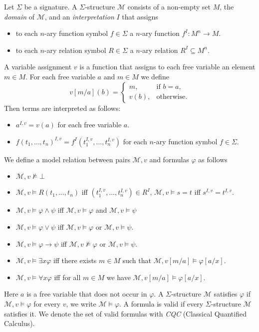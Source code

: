 \documentclass[runningheads]{llncs}
\begin{document}
\begin{definition}
	Let $\Sigma$ be a signature. A $\Sigma$-structure $\mathcal{M}$ consists of a non-empty set $M$, the \emph{domain} of $\mathcal{M}$, and an \emph{interpretation} $I$ that assigns
	\begin{itemize}
		\item to each $n$-ary function symbol $f\in\Sigma$ a $n$-ary function $f^I: M^n\to M$.
		\item to each $n$-ary relation symbol $R\in\Sigma$ a $n$-ary relation $R^I\subseteq M^n$.
	\end{itemize}
	A variable assignment $v$ is a function that assigns to each free variable an element $m\in M$. For each free variable $a$ and $m\in M$ we define $$v[m/a](b) = \begin{cases}
	m, &\text{if $b=a$,}\\
	v(b), &\text{otherwise.}
	\end{cases}$$
	Then terms are interpreted as follows:
	\begin{itemize}
		\item $a^{I, v} = v(a)$ for each free variable $a$.
		\item $f(t_1,\dots,t_n)^{I, v} = f^I(t_1^{I, v},\dots, t_n^{I, v})$ for each $n$-ary function symbol $f\in\Sigma$.
	\end{itemize}
	We define a model relation between pairs $\mathcal M, v$ and formulas $\varphi$ as follows
	\begin{itemize}
		\item $\mathcal M, v\not\models\bot$
		\item $\mathcal M, v\models R(t_1,\dots,t_n)$ iff $(t_1^{I, v},\dots,t_n^{I, v})\in R^I$, $\mathcal M, v\models s = t$ iff $s^{I, v} = t^{I, v}$.
		\item $\mathcal M, v\models \varphi\wedge \psi$ iff $\mathcal M, v\models\varphi$ and $\mathcal M, v\models\psi$
		\item $\mathcal M, v\models \varphi\vee\psi$ iff $\mathcal M, v\models\varphi$ or $\mathcal M, v\models\psi$.
		\item $\mathcal M, v\models \varphi\to\psi$ iff $\mathcal M, v\not\models\varphi$ or $\mathcal M, v\models\psi$.
		\item $\mathcal M, v\models\exists x\varphi$ iff there exists $m\in M$ such that $\mathcal M, v[m/a]\models\varphi[a/x]$.
		\item $\mathcal M, v\models\forall x\varphi$ iff for all $m\in M$ we have $\mathcal M, v[m/a]\models\varphi[a/x]$.
	\end{itemize}
	 Here $a$ is a free variable that does not occur in $\varphi$. A $\Sigma$-structure $\mathcal M$ satisfies $\varphi$ if $\mathcal M, v\models\varphi$ for every $v$, we write $\mathcal M\models\varphi$. A formula is valid if every $\Sigma$-structure $\mathcal M$ satisfies it. We denote the set of valid formulas with \emph{CQC} (Classical Quantified Calculus).
\end{definition}
\end{document}

